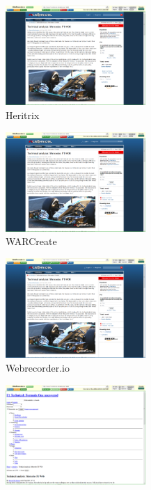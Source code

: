 \documentclass{article}
\begin{document}
\begin{center}
\begin{figure}[ht]
    \centering
    \includegraphics[width=0.475\textwidth,natwidth=700,natheight=700]{ex3-heritrix.png}
    \caption{Heritrix}
    \label{fig:url3_heritrix}
\end{figure}
\begin{figure}[ht]
    \centering
    \includegraphics[width=0.475\textwidth,natwidth=700,natheight=700]{ex3-warcreate.png}
    \caption{WARCreate}
    \label{fig:url3_war_create}
\end{figure}
\begin{figure}[ht]
    \centering
    \includegraphics[width=0.475\textwidth,natwidth=700,natheight=700]{ex3-webrecorder.png}
    \caption{Webrecorder.io}
    \label{fig:url3_webrecorder}
\end{figure}
\begin{figure}[ht]
    \centering
    \includegraphics[width=0.475\textwidth,natwidth=700,natheight=700]{ex3-wget.png}

\end{figure}
\end{center}
\end{document}
